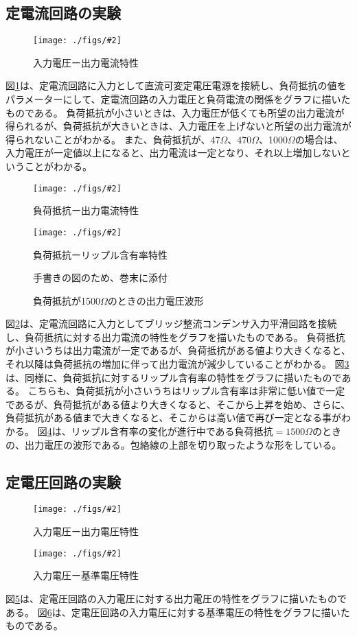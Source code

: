 \documentclass[11pt]{jsarticle}
\newcommand{\fg}[3]{ %
    \begin{figure}
        \begin{center}
            \texttt{[image: ./figs/\#2]}
            \caption{#3}
            \label{#1}
        \end{center}
    \end{figure}
}
\newcommand{\dummyfig}[2]{
    \begin{figure}
        \begin{center}
            \begin{shadebox}
                手書きの図のため、巻末に添付
            \end{shadebox}
            \caption{#2}
            \label{#1}
        \end{center}
    \end{figure}
}
\newcommand{\fr}[1]{図\ref{#1}}
\begin{document}
\subsection{定電流回路の実験}
\fg{fig14}{{3.voltage}.png}{入力電圧ー出力電流特性}
\fr{fig14}は、定電流回路に入力として直流可変定電圧電源を接続し、負荷抵抗の値をパラメーターにして、定電流回路の入力電圧と負荷電流の関係をグラフに描いたものである。
負荷抵抗が小さいときは、入力電圧が低くても所望の出力電流が得られるが、負荷抵抗が大きいときは、入力電圧を上げないと所望の出力電流が得られないことがわかる。
また、負荷抵抗が、47$\Omega$、470$\Omega$、1000$\Omega$の場合は、入力電圧が一定値以上になると、出力電流は一定となり、それ以上増加しないということがわかる。

\fg{fig15}{{4.current}.png}{負荷抵抗ー出力電流特性}
\fg{fig16}{{4.ripple}.png}{負荷抵抗ーリップル含有率特性}
\dummyfig{fig17}{負荷抵抗が1500$\Omega$のときの出力電圧波形}
\fr{fig15}は、定電流回路に入力としてブリッジ整流コンデンサ入力平滑回路を接続し、負荷抵抗に対する出力電流の特性をグラフを描いたものである。
負荷抵抗が小さいうちは出力電流が一定であるが、負荷抵抗がある値より大きくなると、それ以降は負荷抵抗の増加に伴って出力電流が減少していることがわかる。
\fr{fig16}は、同様に、負荷抵抗に対するリップル含有率の特性をグラフに描いたものである。
こちらも、負荷抵抗が小さいうちはリップル含有率は非常に低い値で一定であるが、負荷抵抗がある値より大きくなると、そこから上昇を始め、さらに、負荷抵抗がある値まで大きくなると、そこからは高い値で再び一定となる事がわかる。
\fr{fig17}は、リップル含有率の変化が進行中である負荷抵抗$=1500\Omega$のときの、出力電圧の波形である。包絡線の上部を切り取ったような形をしている。

\subsection{定電圧回路の実験}
\fg{fig18}{{5.output}.png}{入力電圧ー出力電圧特性}
\fg{fig19}{{5.zener}.png}{入力電圧ー基準電圧特性}
\fr{fig18}は、定電圧回路の入力電圧に対する出力電圧の特性をグラフに描いたものである。
\fr{fig19}は、定電圧回路の入力電圧に対する基準電圧の特性をグラフに描いたものである。
\end{document}
